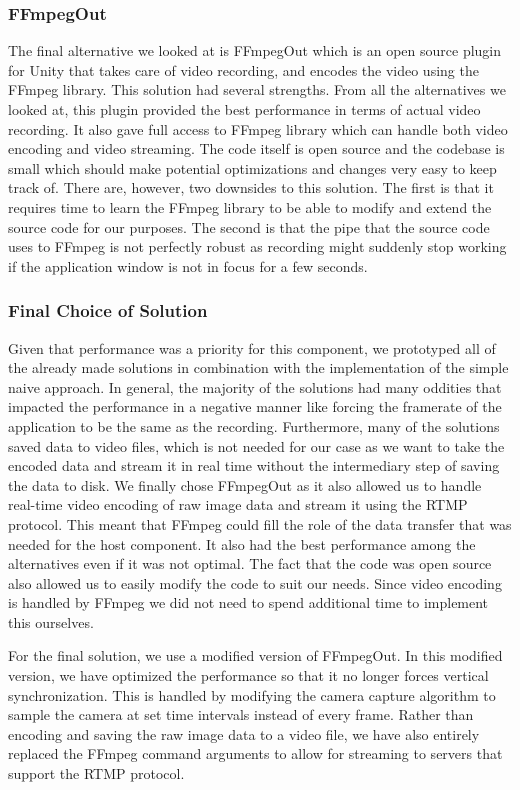\subsubsection{FFmpegOut}
The final alternative we looked at is FFmpegOut\cite{ffmpegOut} which is an open source plugin for Unity that takes care of video recording, and encodes the video using the FFmpeg\cite{ffmpeg} library. This solution had several strengths. From all the alternatives we looked at, this plugin provided the best performance in terms of actual video recording. It also gave full access to FFmpeg library which can handle both video encoding and video streaming. The code itself is open source and the codebase is small which should make potential optimizations and changes very easy to keep track of. There are, however, two downsides to this solution. The first is that it requires time to learn the FFmpeg library to be able to modify and extend the source code for our purposes. The second is that the pipe that the source code uses to FFmpeg is not perfectly robust as recording might suddenly stop working if the application window is not in focus for a few seconds.  

\subsubsection{Final Choice of Solution}
Given that performance was a priority for this component, we prototyped all of the already made solutions in combination with the implementation of the simple naive approach. In general, the majority of the solutions had many oddities that impacted the performance in a negative manner like forcing the framerate of the application to be the same as the recording. Furthermore, many of the solutions saved data to video files, which is not needed for our case as we want to take the encoded data and stream it in real time without the intermediary step of saving the data to disk. We finally chose FFmpegOut as it also allowed us to handle real-time video encoding of raw image data and stream it using the RTMP protocol. This meant that FFmpeg could fill the role of the data transfer that was needed for the host component. It also had the best performance among the alternatives even if it was not optimal. The fact that the code was open source also allowed us to easily modify the code to suit our needs. Since video encoding is handled by FFmpeg we did not need to spend additional time to implement this ourselves. 

For the final solution, we use a modified version of FFmpegOut. In this modified version, we have optimized the performance so that it no longer forces vertical synchronization. This is handled by modifying the camera capture algorithm to sample the camera at set time intervals instead of every frame. Rather than encoding and saving the raw image data to a video file, we have also entirely replaced the FFmpeg command arguments to allow for streaming to servers that support the RTMP protocol. 

